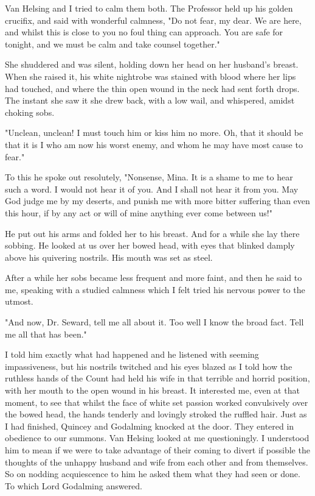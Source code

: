 Van Helsing and I tried to calm them both. The Professor held up his golden crucifix, and said with wonderful calmness, "Do not fear, my dear. We are here, and whilst this is close to you no foul thing can approach. You are safe for tonight, and we must be calm and take counsel together." 

She shuddered and was silent, holding down her head on her husband's breast. When she raised it, his white nightrobe was stained with blood where her lips had touched, and where the thin open wound in the neck had sent forth drops. The instant she saw it she drew back, with a low wail, and whispered, amidst choking sobs. 

"Unclean, unclean! I must touch him or kiss him no more. Oh, that it should be that it is I who am now his worst enemy, and whom he may have most cause to fear." 

To this he spoke out resolutely, "Nonsense, Mina. It is a shame to me to hear such a word. I would not hear it of you. And I shall not hear it from you. May God judge me by my deserts, and punish me with more bitter suffering than even this hour, if by any act or will of mine anything ever come between us!" 

He put out his arms and folded her to his breast. And for a while she lay there sobbing. He looked at us over her bowed head, with eyes that blinked damply above his quivering nostrils. His mouth was set as steel. 

After a while her sobs became less frequent and more faint, and then he said to me, speaking with a studied calmness which I felt tried his nervous power to the utmost. 

"And now, Dr. Seward, tell me all about it. Too well I know the broad fact. Tell me all that has been." 

I told him exactly what had happened and he listened with seeming impassiveness, but his nostrils twitched and his eyes blazed as I told how the ruthless hands of the Count had held his wife in that terrible and horrid position, with her mouth to the open wound in his breast. It interested me, even at that moment, to see that whilst the face of white set passion worked convulsively over the bowed head, the hands tenderly and lovingly stroked the ruffled hair. Just as I had finished, Quincey and Godalming knocked at the door. They entered in obedience to our summons. Van Helsing looked at me questioningly. I understood him to mean if we were to take advantage of their coming to divert if possible the thoughts of the unhappy husband and wife from each other and from themselves. So on nodding acquiescence to him he asked them what they had seen or done. To which Lord Godalming answered. 

